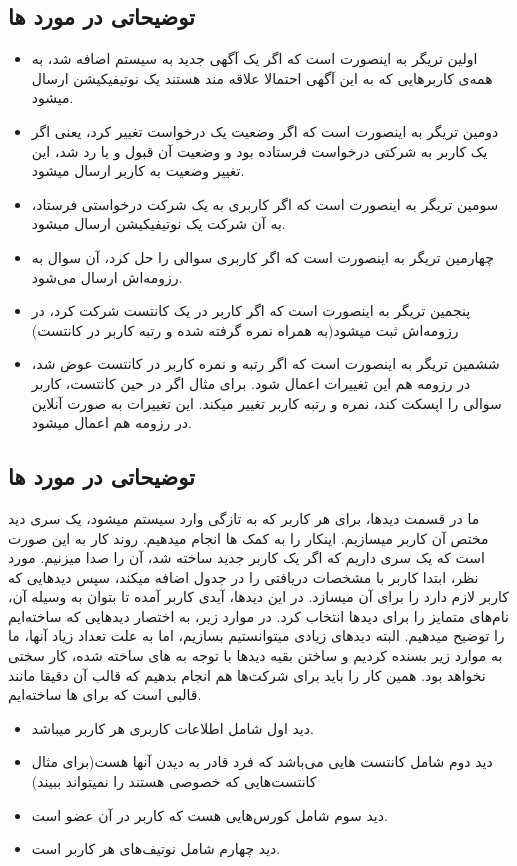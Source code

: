 \documentclass{article}
\begin{document}
    \subsection{توضیحاتی در مورد ها}
        \begin{itemize}
            \item اولین تریگر به اینصورت است که اگر یک آگهی جدید به سیستم اضافه شد، به همه‌ی کاربرهایی که به این آگهی احتمالا علاقه مند هستند یک نوتیفیکیشن ارسال میشود.
            \item دومین تریگر به اینصورت است که اگر وضعیت یک درخواست تغییر کرد، یعنی اگر یک کاربر به شرکتی درخواست فرستاده بود و وضعیت آن قبول و یا رد شد، این تغییر وضعیت به کاربر ارسال میشود.
            \item سومین تریگر به اینصورت است که اگر کاربری به یک شرکت درخواستی فرستاد، به آن شرکت یک نوتیفیکیشن ارسال میشود.
            \item چهارمین تریگر به اینصورت است که اگر کاربری سوالی را حل کرد، آن سوال به رزومه‌اش ارسال می‌شود.
            \item پنجمین تریگر به اینصورت است که اگر کاربر در یک کانتست شرکت کرد، در رزومه‌اش ثبت میشود(به همراه نمره گرفته شده و رتبه کاربر در کانتست)
            \item ششمین تریگر به اینصورت است که اگر رتبه و نمره کاربر در کانتست عوض شد، در رزومه هم این تغییرات اعمال شود. برای مثال اگر در حین کانتست، کاربر سوالی را اپسکت کند، نمره و رتبه کاربر تغییر میکند. این تغییرات به صورت آنلاین در رزومه هم اعمال میشود.
        \end{itemize}
    \subsection{توضیحاتی در مورد ها}
        ما در قسمت دیدها، برای هر کاربر که به تازگی وارد سیستم میشود، یک سری دید مختص آن کاربر میسازیم. اینکار را به کمک ها انجام میدهیم.
        روند کار به این صورت است که یک سری  داریم که اگر یک کاربر جدید ساخته شد، آن را صدا میزنیم.  مورد نظر، ابتدا کاربر با مشخصات دریافتی را در جدول  اضافه میکند، سپس دیدهایی که کاربر لازم دارد را برای آن میسازد.
        در این دیدها، آیدی کاربر آمده تا بتوان به وسیله آن، نام‌های متمایز را برای دیدها انتخاب کرد. در موارد زیر، به اختصار دیدهایی که ساخته‌ایم را توضیح میدهیم.
        البته دیدهای زیادی میتوانستیم بسازیم، اما به علت تعداد زیاد آنها، ما به موارد زیر بسنده کردیم و ساختن بقیه دیدها با توجه به های ساخته شده، کار سختی نخواهد بود.
        همین کار را باید برای شرکت‌ها هم انجام بدهیم که قالب آن دقیقا مانند قالبی است که برای ها ساخته‌ایم.
        \begin{itemize}
            \item دید اول شامل اطلاعات کاربری هر کاربر میباشد.
            \item دید دوم شامل کانتست هایی می‌باشد که فرد قادر به دیدن آنها هست(برای مثال کانتست‌هایی که خصوصی هستند را نمیتواند ببیند)
            \item دید سوم شامل کورس‌هایی هست که کاربر در آن عضو است.
            \item دید چهارم شامل نوتیف‌های هر کاربر است.
        \end{itemize}
\end{document}
